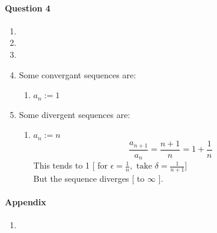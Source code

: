 \documentclass[20pt]{extarticle} %
\begin{document}
\paragraph{Question 4}
\begin{enumerate}
	\item
	\item
	\item
	\item Some convergant sequences are:
		\begin{enumerate}
			\item	$a_n:=1$
		\end{enumerate}
	\item Some divergent sequences are: \begin{enumerate}
		\item	$a_n := n$
			\[\frac{  a_{n+1} }{  a_n  }= \frac{n+1}{n}=1+ \frac{1}{n} \]
			This tends to 1 [ for $ \epsilon= \frac{1}{n} , \text{ take } \delta = \frac{1}{n+1}   $]\\
			But the sequence diverges [ to $\infty$  ].
	\end{enumerate}
\end{enumerate}

\paragraph{Appendix}
\begin{enumerate}
	\item {}
\end{enumerate}
\end{document}
